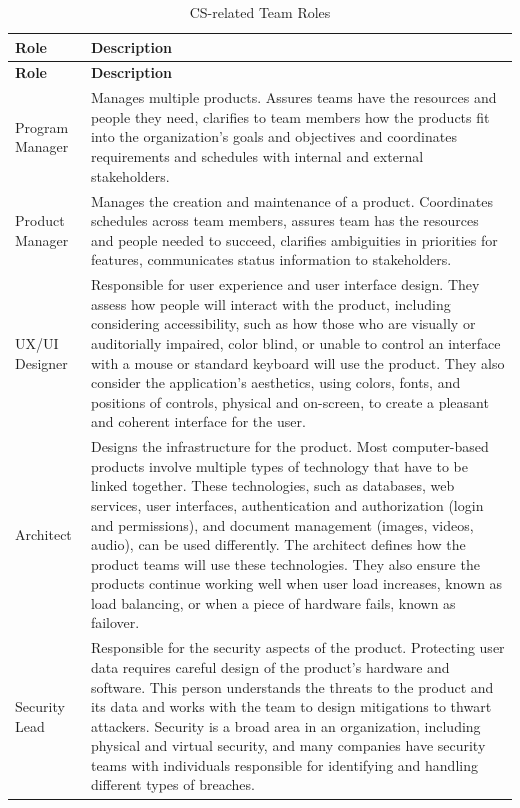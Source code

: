 \begin{longtable}[H]{p{.8in}|p{3.6in}}
	\caption{CS-related Team Roles}
	\label{tab:table2}\\
	\textbf{Role} & \textbf{Description}\\
	\hline
	\endfirsthead
	\textbf{Role} & \textbf{Description}\\
	\endhead
	\Tstrut Program Manager & Manages multiple products. Assures teams have the resources and people they need, clarifies to team members how the products fit into the organization's goals and objectives and coordinates requirements and schedules with internal and external stakeholders.\\
	\hline
	\Tstrut Product Manager & Manages the creation and maintenance of a product. Coordinates schedules across team members, assures team has the resources and people needed to succeed, clarifies ambiguities in priorities for features, communicates status information to stakeholders.\\
	\hline
	\Tstrut UX/UI \linebreak Designer & Responsible for user experience and user interface design. They assess how people will interact with the product, including considering accessibility, such as how those who are visually or auditorially impaired, color blind, or unable to control an interface with a mouse or standard keyboard will use the product. They also consider the application's aesthetics, using colors, fonts, and positions of controls, physical and on-screen, to create a pleasant and coherent interface for the user.\\
	\hline
	\Tstrut Architect & Designs the infrastructure for the product. Most computer-based products involve multiple types of technology that have to be linked together. These technologies, such as databases, web services, user interfaces, authentication and authorization (login and permissions), and document management (images, videos, audio), can be used differently. The architect defines how the product teams will use these technologies. They also ensure the products continue working well when user load increases, known as load balancing, or when a piece of hardware fails, known as failover.\\
	\hline
	\Tstrut Security Lead & Responsible for the security aspects of the product. Protecting user data requires careful design of the product's hardware and software. This person understands the threats to the product and its data and works with the team to design mitigations to thwart attackers. Security is a broad area in an organization, including physical and virtual security, and many companies have security teams with individuals responsible for identifying and handling different types of breaches.\\

\end{longtable}
